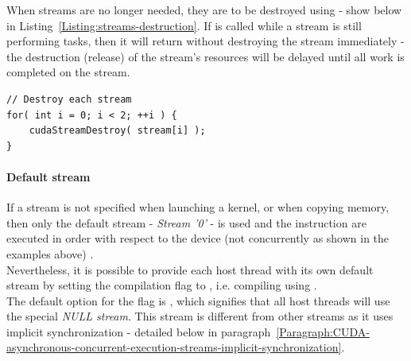 When streams are no longer needed, they are to be destroyed using  - show below in Listing~\ref{Listing:streams-destruction}. If  is called while a stream is still performing tasks, then it will return without destroying the stream immediately - the destruction (release) of the stream's resources will be delayed until all work is completed on the stream.

\begin{lstlisting}[caption={Destruction of streams. Taken from Nvidia's \emph{CUDA C++ Programming Guide} \cite{NVIDIAMay2022}.},label={Listing:streams-destruction}]
// Destroy each stream
for( int i = 0; i < 2; ++i ) {
	cudaStreamDestroy( stream[i] );
}
\end{lstlisting}

\paragraph{Default stream}\label{Paragraph:CUDA-asynchronous-concurrent-execution-streams-default-stream}
If a stream is not specified when launching a kernel, or when copying memory, then only the default stream - \textit{Stream '0'} - is used and the instruction are executed in order with respect to the device (not concurrently as shown in the examples above) \cite{NVIDIAMay2022}. \\
Nevertheless, it is possible to provide each host thread with its own default stream by setting the  compilation flag to , i.e. compiling using . \\
The default option for the flag is , which signifies that all host threads will use the special \textit{NULL stream}. This stream is different from other streams as it uses implicit synchronization - detailed below in paragraph~\ref{Paragraph:CUDA-asynchronous-concurrent-execution-streams-implicit-synchronization}.

